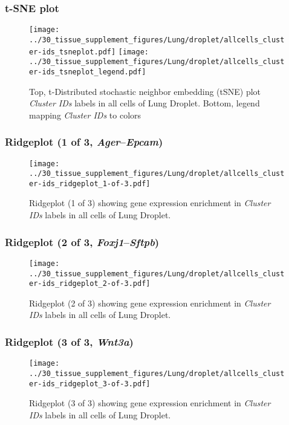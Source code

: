 \clearpage
\subsubsection{t-SNE plot}
\begin{figure}[h]
\centering
\texttt{[image: ../30\_tissue\_supplement\_figures/Lung/droplet/allcells\_cluster-ids\_tsneplot.pdf]}
\texttt{[image: ../30\_tissue\_supplement\_figures/Lung/droplet/allcells\_cluster-ids\_tsneplot\_legend.pdf]}
\caption{Top, t-Distributed stochastic neighbor embedding (tSNE) plot  \emph{Cluster IDs} labels in all cells of Lung Droplet. Bottom, legend mapping \emph{Cluster IDs} to colors}
\end{figure}


\clearpage

\subsubsection{Ridgeplot (1 of 3, \emph{Ager}--\emph{Epcam})}
\begin{figure}[h]
\centering
\texttt{[image: ../30\_tissue\_supplement\_figures/Lung/droplet/allcells\_cluster-ids\_ridgeplot\_1-of-3.pdf]}

\caption{ Ridgeplot (1 of 3)  showing gene expression enrichment in \emph{Cluster IDs} labels in all cells of Lung Droplet. }
\end{figure}


\clearpage

\subsubsection{Ridgeplot (2 of 3, \emph{Foxj1}--\emph{Sftpb})}
\begin{figure}[h]
\centering
\texttt{[image: ../30\_tissue\_supplement\_figures/Lung/droplet/allcells\_cluster-ids\_ridgeplot\_2-of-3.pdf]}

\caption{ Ridgeplot (2 of 3)  showing gene expression enrichment in \emph{Cluster IDs} labels in all cells of Lung Droplet. }
\end{figure}


\clearpage

\subsubsection{Ridgeplot (3 of 3, \emph{Wnt3a})}
\begin{figure}[h]
\centering
\texttt{[image: ../30\_tissue\_supplement\_figures/Lung/droplet/allcells\_cluster-ids\_ridgeplot\_3-of-3.pdf]}

\caption{ Ridgeplot (3 of 3)  showing gene expression enrichment in \emph{Cluster IDs} labels in all cells of Lung Droplet. }
\end{figure}


